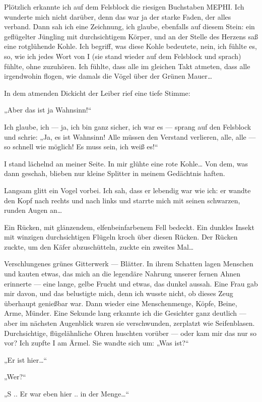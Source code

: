 Plötzlich erkannte ich auf dem Felsblock die riesigen Buchstaben
MEPHI. Ich wunderte mich nicht darüber, denn das war ja der starke
Faden, der alles verband. Dann sah ich eine Zeichnung, ich glaube,
ebenfalls auf diesem Stein: ein geflügelter Jüngling mit
durchsichtigem Körper, und an der Stelle des Herzens saß eine
rotglühende Kohle. Ich begriff, was diese Kohle bedeutete, nein,
ich fühlte es, so, wie ich jedes Wort von I (sie stand wieder auf
dem Felsblock und sprach) fühlte, ohne zuzuhören. Ich fühlte, dass
alle im gleichen Takt atmeten, dass alle irgendwohin flogen, wie
damals die Vögel über der Grünen Mauer\ldots{}

In dem atmenden Dickicht
der Leiber rief eine tiefe Stimme:

„Aber das ist ja Wahnsinn!“

Ich glaube, ich — ja, ich bin ganz sicher, ich war es — sprang auf
den Felsblock und schrie: „Ja, es ist Wahnsinn! Alle müssen den
Verstand verlieren, alle, alle — so schnell wie möglich! Es muss
sein, ich weiß es!“

I stand lächelnd an meiner Seite. In mir glühte eine rote Kohle\ldots{}
Von dem, was dann geschah, blieben nur kleine Splitter in meinem
Gedächtnis haften.

Langsam glitt ein Vogel vorbei. Ich sah, dass er
lebendig war wie ich: er wandte den Kopf nach rechts und nach links
und starrte mich mit seinen schwarzen, runden Augen an\ldots{}

Ein Rücken, mit glänzendem, elfenbeinfarbenem Fell bedeckt. Ein
dunkles Insekt mit winzigen durchsichtigen Flügeln kroch über
diesen Rücken. Der Rücken zuckte, um den Käfer abzuschütteln,
zuckte ein zweites Mal\ldots{}

Verschlungenes grünes Gitterwerk —
Blätter. In ihrem Schatten lagen Menschen und kauten etwas, das
mich an die legendäre Nahrung unserer fernen Ahnen erinnerte — eine
lange, gelbe Frucht und etwas, das dunkel aussah. Eine Frau gab mir
davon, und das belustigte mich, denn ich wusste nicht, ob dieses
Zeug überhaupt genießbar war. Dann wieder eine Menschenmenge,
Köpfe, Beine, Arme, Münder. Eine Sekunde lang erkannte ich die
Gesichter ganz deutlich — aber im nächsten Augenblick waren sie
verschwunden, zerplatzt wie Seifenblasen. Durchsichtige,
flügelähnliche Ohren huschten vorüber — oder kam mir das nur so
vor? Ich zupfte I am Ärmel. Sie wandte sich um: „Was ist?“

„Er ist hier\ldots{}“

„Wer?“

„S .. Er war eben hier .. in der Menge\ldots{}“

